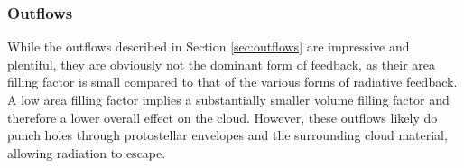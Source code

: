 \documentclass{aa}
\begin{document}

%
%
%
%


\subsubsection{Outflows}
\label{sec:outflowdiscussion}
While the outflows described in Section \ref{sec:outflows} are impressive and
plentiful, they are obviously not the dominant form of feedback, as their area
filling factor is small compared to that of the various forms of radiative
feedback.  A low area filling factor implies a substantially smaller volume
filling factor and therefore a lower overall effect on the cloud.  However,
these outflows likely do punch holes through protostellar envelopes and the
surrounding cloud material, allowing radiation to escape.
\end{document}
